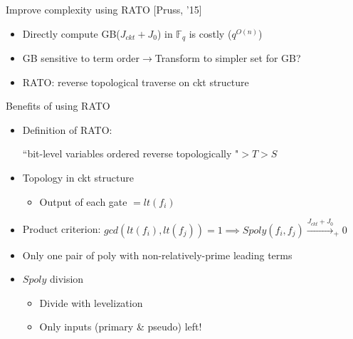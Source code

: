 \documentclass[xcolor=dvipsnames]{beamer}
\newcommand{\Fq}{{\mathbb{F}}_{q}}
\newcommand{\bi}{\begin{itemize}}
\newcommand{\ei}{\end{itemize}}
\begin{document}
\begin{frame}{\large{Improve complexity using RATO [Pruss, '15]}}
\bi
\item Directly compute GB($J_{ckt}+J_0$) in $\Fq$ is costly ($q^{O(n)}$)
\item GB sensitive to term order$\to$Transform to simpler set for GB?
\pause
\item RATO: reverse topological traverse on ckt structure
\ei
\begin{figure}[H]
\end{figure}
\hyperlink{Buch}{}
\end{frame}
\begin{frame}[label = linkRATO]{\large{Benefits of using RATO}}
\bi
\item Definition of RATO:\par 
``bit-level variables ordered reverse topologically "$ > T>S$
\item Topology in ckt structure
	\bi
	\item Output of each gate $= lt(f_i)$
	\ei
\item Product criterion: $gcd(lt(f_i),lt(f_j)) = 1 \implies Spoly(f_i,f_j) \xrightarrow{J_{ckt}+J_0}_+ 0$
\item Only one pair of poly with non-relatively-prime leading terms
	
\item $Spoly$ division
	\bi
	\item Divide with levelization
	\item Only inputs (primary \& pseudo) left!
	\ei
\ei
\end{frame}
\end{document}
